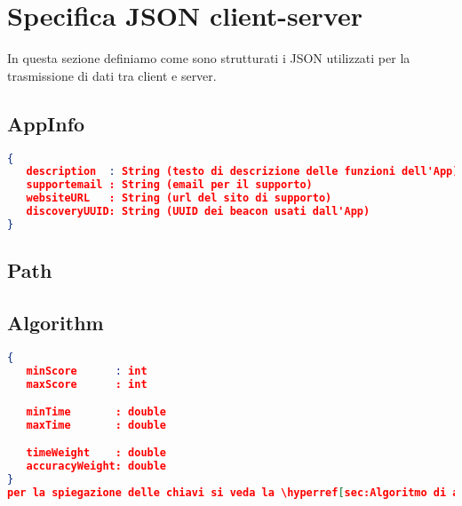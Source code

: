 \section{Specifica JSON client-server}
\label{sec:Specifica JSON client-server}

In questa sezione definiamo come sono strutturati i JSON utilizzati per la trasmissione di dati tra client e server.

\subsection{AppInfo}
\label{sub:AppInfo}
\begin{lstlisting}[language=json,firstnumber=1]
{
   description  : String (testo di descrizione delle funzioni dell'App)
   supportemail : String (email per il supporto)
   websiteURL   : String (url del sito di supporto)
   discoveryUUID: String (UUID dei beacon usati dall'App)
}
\end{lstlisting}



\subsection{Path}
\label{sub:Path}


\subsection{Algorithm}
\label{sub:Algorithm}
\begin{lstlisting}[language=json,firstnumber=1]
{
   minScore      : int
   maxScore      : int

   minTime       : double
   maxTime       : double

   timeWeight    : double
   accuracyWeight: double
}
per la spiegazione delle chiavi si veda la \hyperref[sec:Algoritmo di assegnazione del punteggio]{sezione corrispondente}.
\end{lstlisting}
